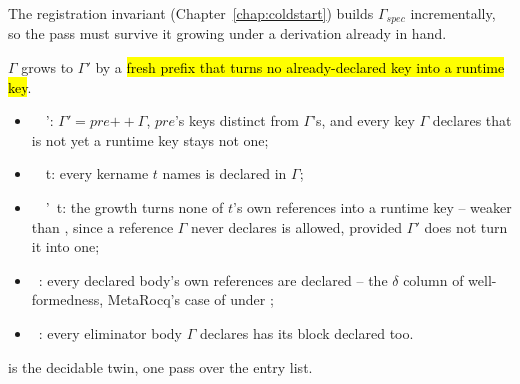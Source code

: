 The registration invariant (Chapter~\ref{chap:coldstart}) builds $\Gamma_{spec}$ incrementally, so the
pass must survive it growing under a derivation already in hand.

\begin{definition}
\label{def:SpecGrow}
\leanok
{}
 $\Gamma$ grows to $\Gamma'$ by a \hl{fresh prefix that turns no already-declared key
into a runtime key}.
\begin{itemize}
\item {}\ \Gamma\ \Gamma': $\Gamma' = pre \mathbin{+\!\!+} \Gamma$, $pre$'s keys distinct
from $\Gamma$'s, and every key $\Gamma$ declares that is not yet a runtime key stays not one;
\item {}\ \Gamma\ t: every kername $t$ names is declared in $\Gamma$;
\item {}\ \Gamma\ \Gamma'\ t: the growth turns none of $t$'s own references into a
runtime key -- weaker than , since a reference $\Gamma$ never declares is allowed,
provided $\Gamma'$ does not turn it into one;
\item {}\ \Gamma: every declared body's own references are declared -- the
$\delta$ column of well-formedness, MetaRocq's  case of  under
;
\item {}\ \Gamma: every eliminator body $\Gamma$ declares has its block declared
too.
\end{itemize}
  is the decidable twin, one pass over the entry list.
\end{definition}

